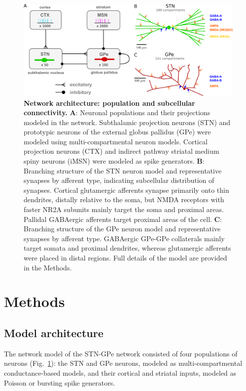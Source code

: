 %
\begin{figure}
\centering
\includegraphics[scale=0.5]{ch_detailed_model/figs/stn-gpe_network_diagram.png}
\caption{\textbf{Network architecture: population and subcellular connectivity.} \textbf{A}: Neuronal populations and their projections modeled in the network. Subthalamic projection neurons (STN) and prototypic neurons of the external globus pallidus (GPe) were modeled using multi-compartmental neuron models. Cortical projection neurons (CTX) and indirect pathway striatal medium spiny neurons (iMSN) were modeled as spike generators. \textbf{B}: Branching structure of the STN neuron model and representative synapses by afferent type, indicating subcellular distribution of synapses. Cortical glutamergic afferents synapse primarily onto thin dendrites, distally relative to the soma, but NMDA receptors with faster NR2A subunits mainly target the soma and proximal areas. Pallidal GABAergic afferents target proximal areas of the cell. \textbf{C}: Branching structure of the GPe neuron model and representative synapses by afferent type. GABAergic GPe-GPe collaterals mainly target somata and proximal dendrites, whereas glutamergic afferents were placed in distal regions. Full details of the model are provided in the Methods.}
\label{fig:network_diagram}
\end{figure}

%
%
%
\section{Methods}
\label{sec:ch3-methods}


%
%
\subsection{Model architecture}

The network model of the STN-GPe network consisted of four populations of neurons (Fig.~\ref{fig:network_diagram}): the STN and GPe neurons, modeled as multi-compartmental conductance-based models, and their cortical and striatal inputs, modeled as Poisson or bursting spike generators.

